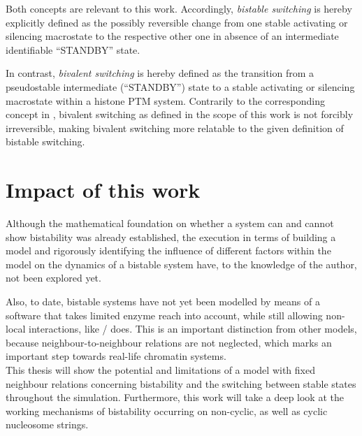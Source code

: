         Both concepts are relevant to this work. Accordingly, \textit{bistable switching} is hereby explicitly defined as the possibly reversible change from one stable activating or silencing macrostate to the respective other one in absence of an intermediate identifiable “STANDBY” state.

        In contrast, \textit{bivalent switching} is hereby defined as the transition from a pseudostable intermediate (“STANDBY”) state to a stable activating or silencing macrostate within a histone PTM system. Contrarily to the corresponding concept in \cite{Hoffmann2015BivalencyReview}, bivalent switching as defined in the scope of this work is not forcibly irreversible, making bivalent switching more relatable to the given definition of bistable switching.
    \section{Impact of this work}
        Although the mathematical foundation on whether a system can and cannot show bistability was already established, the execution in terms of building a model and rigorously identifying the influence of different factors within the model on the dynamics of a bistable system have, to the knowledge of the author, not been explored yet.

        Also, to date, bistable systems have not yet been modelled by means of a software that takes limited enzyme reach into account, while still allowing non-local interactions, like \ed/ does. This is an important distinction from other models, because neighbour-to-neighbour relations are not neglected, which marks an important step towards real-life chromatin systems.\\

        This thesis will show the potential and limitations of a model with fixed neighbour relations concerning bistability and the switching between stable states throughout the simulation. Furthermore, this work will take a deep look at the working mechanisms of bistability occurring on non-cyclic, as well as cyclic nucleosome strings.
%
%
